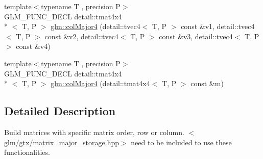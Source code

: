 \begin{DoxyCompactItemize}
\item 
{\footnotesize template$<$typename T , precision P$>$ }\\G\-L\-M\-\_\-\-F\-U\-N\-C\-\_\-\-D\-E\-C\-L detail\-::tmat4x4\\*
$<$ T, P $>$ \hyperlink{group__gtx__matrix__major__storage_ga50e127c56370410d8054be2cdef03503}{glm\-::col\-Major4} (detail\-::tvec4$<$ T, P $>$ const \&v1, detail\-::tvec4$<$ T, P $>$ const \&v2, detail\-::tvec4$<$ T, P $>$ const \&v3, detail\-::tvec4$<$ T, P $>$ const \&v4)
\item 
{\footnotesize template$<$typename T , precision P$>$ }\\G\-L\-M\-\_\-\-F\-U\-N\-C\-\_\-\-D\-E\-C\-L detail\-::tmat4x4\\*
$<$ T, P $>$ \hyperlink{group__gtx__matrix__major__storage_ga89086c0396205669304be98a8c601b78}{glm\-::col\-Major4} (detail\-::tmat4x4$<$ T, P $>$ const \&m)
\end{DoxyCompactItemize}


\subsection{Detailed Description}
Build matrices with specific matrix order, row or column. $<$\hyperlink{matrix__major__storage_8hpp}{glm/gtx/matrix\-\_\-major\-\_\-storage.\-hpp}$>$ need to be included to use these functionalities. 

